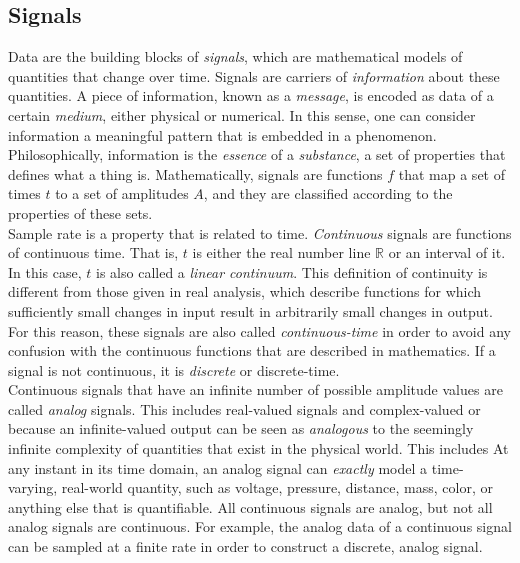 

\subsection{Signals}

Data are the building blocks of \textit{signals}, which are mathematical models of quantities that change over time. Signals are carriers of \textit{information} about these quantities. A piece of information, known as a \textit{message}, is encoded as data of a certain \textit{medium}, either physical or numerical. In this sense, one can consider information a meaningful pattern that is embedded in a phenomenon. Philosophically, information is the \textit{essence} of a \textit{substance}, a set of properties that defines what a thing is. Mathematically, signals are functions $f$ that map a set of times $t$ to a set of amplitudes $A$, and they are classified according to the properties of these sets. \\

Sample rate is a property that is related to time. \textit{Continuous} signals are functions of continuous time. That is, $t$ is either the real number line $\mathbb{R}$ or an interval of it. In this case, $t$ is also called a \textit{linear continuum}. This definition of continuity is different from those given in real analysis, which describe functions for which sufficiently small changes in input result in arbitrarily small changes in output. For this reason, these signals are also called \textit{continuous-time} in order to avoid any confusion with the continuous functions that are described in mathematics. If a signal is not continuous, it is \textit{discrete} or discrete-time. \\

Continuous signals that have an infinite number of possible amplitude values are called \textit{analog} signals. This includes real-valued signals and complex-valued or  because an infinite-valued output can be seen as \textit{analogous} to the seemingly infinite complexity of quantities that exist in the physical world. This includes At any instant in its time domain, an analog signal can \textit{exactly} model a time-varying, real-world quantity, such as voltage, pressure, distance, mass, color, or anything else that is quantifiable. All continuous signals are analog, but not all analog signals are continuous. For example, the analog data of a continuous signal can be sampled at a finite rate in order to construct a discrete, analog signal. \\

